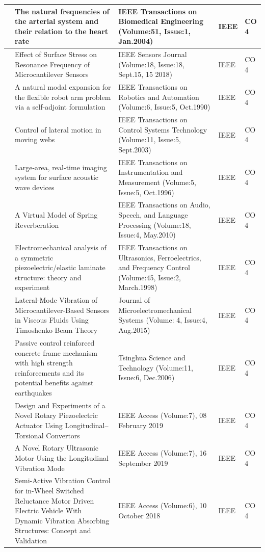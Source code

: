 \documentclass[11pt,paper=a4,answers]{exam}
\begin{document}
\begin{flushleft}
\begin{longtable}{|>{\centering\arraybackslash}p{1.4cm}  |  >{\raggedright\arraybackslash}p{6cm} |>{\centering\arraybackslash}p{3.75cm}|>{\centering\arraybackslash}p{2cm} |>{\centering\arraybackslash}p{2cm} |}
134&The natural frequencies of the arterial system and their relation to the heart rate&IEEE Transactions on Biomedical Engineering (Volume:51, Issue:1, Jan.2004)&IEEE&CO 4\\\hline
135&Effect of Surface Stress on Resonance Frequency of Microcantilever Sensors&IEEE Sensors Journal (Volume:18, Issue:18, Sept.15, 15 2018)&IEEE&CO 4\\\hline
136&A natural modal expansion for the flexible robot arm problem via a self-adjoint formulation&IEEE Transactions on Robotics and Automation (Volume:6, Issue:5, Oct.1990)&IEEE&CO 4\\\hline
137&Control of lateral motion in moving webs&IEEE Transactions on Control Systems Technology (Volume:11, Issue:5, Sept.2003)&IEEE&CO 4\\\hline
138&Large-area, real-time imaging system for surface acoustic wave devices&IEEE Transactions on Instrumentation and Measurement (Volume:5, Issue:5, Oct.1996)&IEEE&CO 4\\\hline
139&A Virtual Model of Spring Reverberation&IEEE Transactions on Audio, Speech, and Language Processing (Volume:18, Issue:4, May.2010)&IEEE&CO 4\\\hline
140&Electromechanical analysis of a symmetric piezoelectric/elastic laminate structure: theory and experiment&IEEE Transactions on Ultrasonics, Ferroelectrics, and Frequency Control (Volume:45, Issue:2, March.1998)&IEEE&CO 4\\\hline
141&Lateral-Mode Vibration of Microcantilever-Based Sensors in Viscous Fluids Using Timoshenko Beam Theory&Journal of Microelectromechanical Systems (Volume: 4, Issue:4, Aug.2015)&IEEE&CO 4\\\hline
142&Passive control reinforced concrete frame mechanism with high strength reinforcements and its potential benefits against earthquakes&Tsinghua Science and Technology (Volume:11, Issue:6, Dec.2006)&IEEE&CO 4\\\hline
143&Design and Experiments of a Novel Rotary Piezoelectric Actuator Using Longitudinal–Torsional Convertors&IEEE Access (Volume:7), 08 February 2019&IEEE&CO 4\\\hline
144&A Novel Rotary Ultrasonic Motor Using the Longitudinal Vibration Mode&IEEE Access (Volume:7), 16 September 2019&IEEE&CO 4\\\hline
145&Semi-Active Vibration Control for in-Wheel Switched Reluctance Motor Driven Electric Vehicle With Dynamic Vibration Absorbing Structures: Concept and Validation&IEEE Access (Volume:6), 10 October 2018&IEEE&CO 4\\\hline

\end{longtable}
\end{flushleft}
\end{document}
